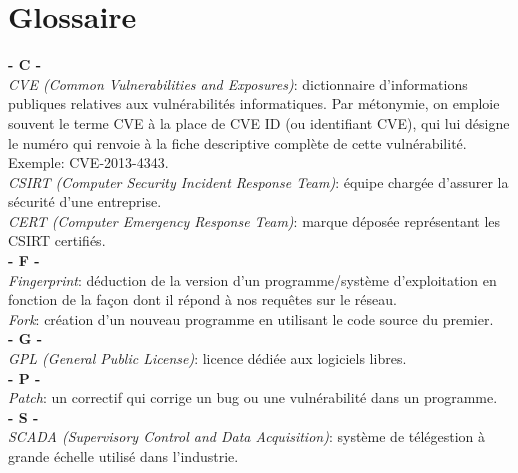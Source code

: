 \section{Glossaire}
\noindent
\vskip 0.1cm
\textbf{- C -}\\
\vskip 0.1cm
\textit{CVE (Common Vulnerabilities and Exposures)}: dictionnaire d'informations publiques relatives aux vulnérabilités informatiques. Par métonymie, on emploie souvent le terme CVE à la place de CVE ID (ou identifiant CVE), qui lui désigne le numéro qui renvoie à la fiche descriptive complète de cette vulnérabilité. Exemple: CVE-2013-4343.\\
\textit{CSIRT (Computer Security Incident Response Team)}: équipe chargée d'assurer la sécurité d'une entreprise.\\
\textit{CERT (Computer Emergency Response Team)}: marque déposée représentant les CSIRT certifiés.\\
\vskip 0.1cm
\textbf{- F -}\\
\vskip 0.1cm
\textit{Fingerprint}: déduction de la version d'un programme/système d'exploitation en fonction de la façon dont il répond à nos requêtes sur le réseau.\\
\textit{Fork}: création d'un nouveau programme en utilisant le code source du premier.\\
\vskip 0.1cm
\textbf{- G -}\\
\vskip 0.1cm
\textit{GPL (General Public License)}: licence dédiée aux logiciels libres.\\
\vskip 0.1cm
\textbf{- P -}\\
\vskip 0.1cm
\textit{Patch}: un correctif qui corrige un bug ou une vulnérabilité dans un programme.\\
\vskip 0.1cm
\textbf{- S -}\\
\vskip 0.1cm
\textit{SCADA (Supervisory Control and Data Acquisition)}: système de télégestion à grande échelle utilisé dans l'industrie.\\

